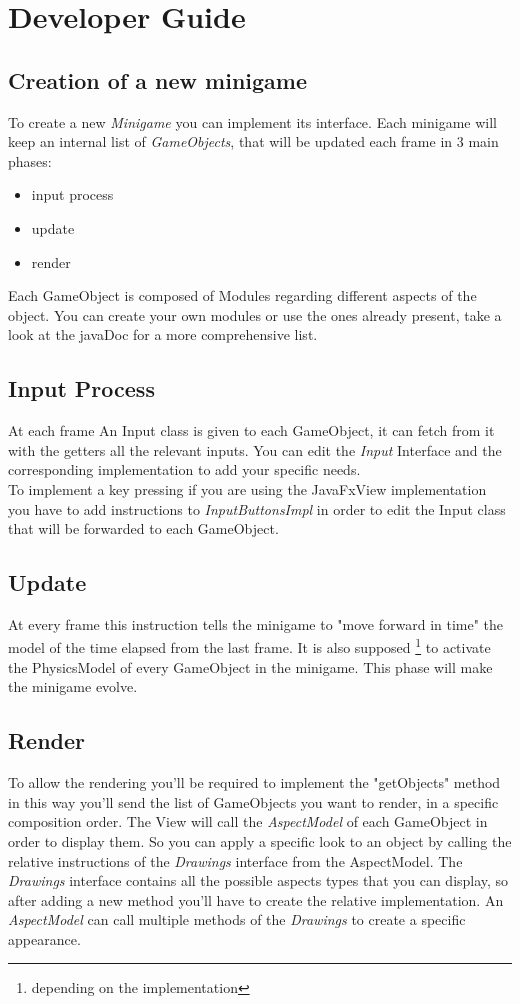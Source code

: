 \documentclass[a4paper,12pt]{report}
\begin{document}
\chapter{Developer Guide}
\section*{Creation of a new minigame}
To create a new \textit{Minigame} you can implement its interface.
Each minigame will keep an internal list of \textit{GameObjects}, that will be updated each frame in 3 main phases:
\begin{itemize}
	\item input process
	\item update
	\item render
\end{itemize}
Each GameObject is composed of Modules regarding different aspects of the object.
You can create your own modules or use the ones already present, take a look at the javaDoc for a more comprehensive list.
\section*{Input Process}
At each frame An Input class is given to each GameObject, it can fetch from it with the getters all the relevant inputs.
You can edit the \textit{Input} Interface and the corresponding implementation to add your specific needs.\\
To implement a key pressing if you are using the JavaFxView implementation you have to add instructions to \textit{InputButtonsImpl} in order to edit the Input class that will be forwarded to each GameObject.

\section*{Update}
At every frame this instruction tells the minigame to "move forward in time" the model of the time elapsed from the last frame. It is also supposed \footnote{depending on the implementation} to activate the PhysicsModel of every GameObject in the minigame.
This phase will make the minigame evolve.
\section*{Render}
To allow the rendering you'll be required to implement the "getObjects" method in this way you'll send the list of GameObjects you want to render, in a specific 
composition order. The View will call the \textit{AspectModel} of each GameObject in order to display them. So you can apply a specific look to an object by calling 
the relative instructions of the \textit{Drawings} interface from the AspectModel. The \textit{Drawings} interface contains all the possible aspects types that you 
can display, so after adding a new method you'll have to create the relative implementation. An \textit{AspectModel} can call multiple methods of the \textit{Drawings} 
to create a specific appearance.
\end{document}
